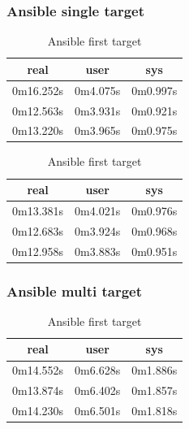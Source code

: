 \documentclass[10pt,]{report}
\begin{document}
\begin{adjustwidth}{20pt}{}
	\subsubsection{Ansible single target}
	\begin{table}[H]
		\caption{Ansible first target}
		\begin{center}
			\begin{tabular}[c]{|c|c|c|}
				\hline
				\multicolumn{1}{|c|}{\textbf{real}} &
				\multicolumn{1}{c|}{\textbf{user}}  &
				\multicolumn{1}{c|}{\textbf{sys}}                         \\
				\hline
				0m16.252s                           & 0m4.075s & 0m0.997s \\
				\hline
				0m12.563s                           & 0m3.931s & 0m0.921s \\
				\hline
				0m13.220s                           & 0m3.965s & 0m0.975s \\
				\hline
			\end{tabular}
		\end{center}
	\end{table}
	\begin{table}[H]
		\caption{Ansible first target}
		\begin{center}
			\begin{tabular}[c]{|c|c|c|}
				\hline
				\multicolumn{1}{|c|}{\textbf{real}} &
				\multicolumn{1}{c|}{\textbf{user}}  &
				\multicolumn{1}{c|}{\textbf{sys}}                         \\
				\hline
				0m13.381s                           & 0m4.021s & 0m0.976s \\
				\hline
				0m12.683s                           & 0m3.924s & 0m0.968s \\
				\hline
				0m12.958s                           & 0m3.883s & 0m0.951s \\
				\hline
			\end{tabular}
		\end{center}
	\end{table}
	\subsubsection{Ansible multi target}
	\begin{table}[H]
		\caption{Ansible first target}
		\begin{center}
			\begin{tabular}[c]{|c|c|c|}
				\hline
				\multicolumn{1}{|c|}{\textbf{real}} &
				\multicolumn{1}{c|}{\textbf{user}}  &
				\multicolumn{1}{c|}{\textbf{sys}}                         \\
				\hline
				0m14.552s                           & 0m6.628s & 0m1.886s \\
				\hline
				0m13.874s                           & 0m6.402s & 0m1.857s \\
				\hline
				0m14.230s                           & 0m6.501s & 0m1.818s \\
				\hline
			\end{tabular}
		\end{center}
	\end{table}

\end{adjustwidth}
\end{document}
